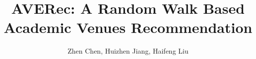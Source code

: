\documentclass[9pt]{acm_proc_article-sp}
\begin{document}
\title{AVERec: A Random Walk Based Academic Venues Recommendation}

\author{
\alignauthor
Zhen Chen, Huizhen Jiang, Haifeng Liu\\
       \\
}
\end{document}
